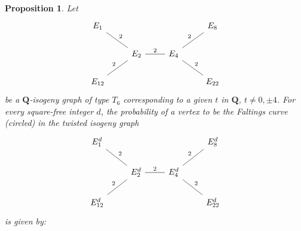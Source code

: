 \documentclass[11pt]{article}
\newtheorem{prop}[defn]{Proposition}
\theoremstyle{definition}
\begin{document}
\begin{prop}
Let 
\[ \begin{tikzcd}
E_1 \ar[dash,dr,"2"] & & & E_8\\
& E_2 \ar[dash,r,"2"] & E_4  \ar[dash,ur,"2"]  \ar[dash,dr,"2"]& \\
E_{12}    \ar[dash,ur,"2"] &  &  & E_{22}    
\end{tikzcd}
\]
be a $\mathbf{Q}$-isogeny graph of type $T_6$ corresponding to a given $t$ in $\mathbf{Q}$, $t\ne 0,\pm 4$. For every square-free integer $d$, 
the probability of a vertex
to be the Faltings curve (circled)
in the twisted isogeny graph 
\[ \begin{tikzcd}
E^d_1 \ar[dash,dr,"2"] & & & E^d_8\\
& E^d_2 \ar[dash,r,"2"] & E^d_4  \ar[dash,ur,"2"]  \ar[dash,dr,"2"]& \\
E^d_{12}    \ar[dash,ur,"2"] &  &  & E^d_{22}    
\end{tikzcd}
\]
is given by:

\newpage


\end{prop}
\end{document}
